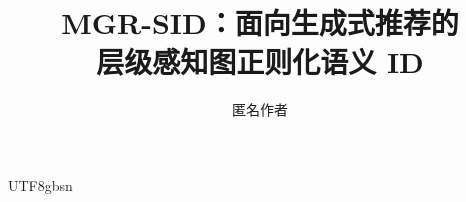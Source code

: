 \documentclass{article}
\title{MGR-SID：面向生成式推荐的\\层级感知图正则化语义 ID}
\author{匿名作者}
\begin{document}
\begin{CJK*}{UTF8}{gbsn}

\maketitle

\begin{abstract}

\end{abstract}











\appendix


\end{CJK*}
\end{document}
